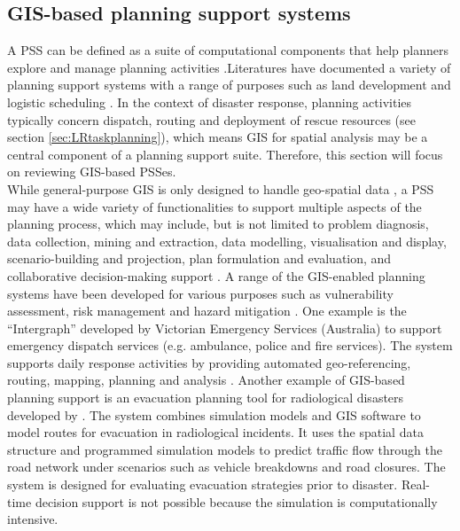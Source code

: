 \subsection{GIS-based planning support systems}
A \acf{PSS} can be defined as a suite of computational components that help planners explore and manage planning activities \citep{Geertman2004}.Literatures have documented a variety of planning support systems with a range of purposes such as land development \citep{Pettit2003}  and logistic scheduling \citep{Miller}. In the context of disaster response, planning activities  typically concern dispatch, routing and deployment of rescue resources (see section \ref{sec:LRtaskplanning}), which means \ac{GIS} for spatial analysis may be a central component of a planning support suite. Therefore, this section will focus on reviewing \ac{GIS}-based \ac{PSS}es. \\

While general-purpose \ac{GIS} is only designed to handle geo-spatial data \citep{Geertman2004}, a \ac{PSS} may have a wide variety of functionalities to support multiple aspects of the planning process, which may include, but is not limited to problem diagnosis, data collection, mining and extraction, data modelling, visualisation and display, scenario-building and projection, plan formulation and evaluation, and collaborative decision-making support \citep{Geertman2004,Zerger2003}. A range of the \ac{GIS}-enabled planning systems have been developed for various purposes such as vulnerability assessment, risk management and hazard mitigation \citep{Cova1999,Schooley2010}. One example is the ``Intergraph'' developed by Victorian Emergency Services (Australia) \citep{IntergraphCorporation2000} to support emergency dispatch services (e.g. ambulance, police and fire services). The system supports daily response activities by providing automated geo-referencing, routing, mapping, planning and analysis \citep{Zerger2003}. Another example of \ac{GIS}-based planning support is an evacuation planning tool for radiological disasters developed by \citep{Eglese1994}. The system combines simulation models and  \ac{GIS} software to model routes for evacuation in radiological incidents.  It uses the spatial data structure and programmed simulation models to predict traffic flow through the road network under scenarios such as vehicle breakdowns and road closures. The system is designed for evaluating evacuation strategies prior to disaster. Real-time decision support is not possible because the simulation is computationally intensive.\\

